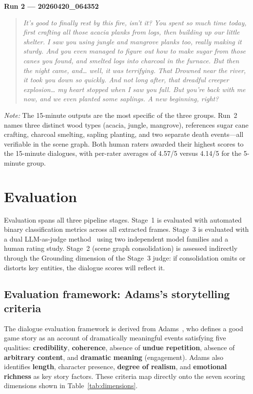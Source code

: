 \documentclass{article}
\begin{document}
\textbf{Run 2 --- 20260420\_064352}
\begin{quote}\itshape
It's good to finally rest by this fire, isn't it? You spent so much time today, first
crafting all those acacia planks from logs, then building up our little shelter. I saw
you using jungle and mangrove planks too, really making it sturdy. And you even managed
to figure out how to make sugar from those canes you found, and smelted logs into
charcoal in the furnace. But then the night came, and\ldots{} well, it was terrifying.
That Drowned near the river, it took you down so quickly. And not long after, that
dreadful creeper explosion\ldots{} my heart stopped when I saw you fall. But you're
back with me now, and we even planted some saplings. A new beginning, right?
\end{quote}

\noindent\textit{Note:} The 15-minute outputs are the most specific of the three groups. Run~2 names three distinct wood types (acacia, jungle, mangrove), references sugar cane crafting, charcoal smelting, sapling planting, and two separate death events---all verifiable in the scene graph. Both human raters awarded their highest scores to the 15-minute dialogues, with per-rater averages of 4.57/5 versus 4.14/5 for the 5-minute group.

\section{Evaluation}

Evaluation spans all three pipeline stages. Stage~1 is evaluated with automated binary classification metrics across all extracted frames. Stage~3 is evaluated with a dual LLM-as-judge method~\cite{Zheng2023} using two independent model families and a human rating study. Stage~2 (scene graph consolidation) is assessed indirectly through the Grounding dimension of the Stage~3 judge: if consolidation omits or distorts key entities, the dialogue scores will reflect it.

\subsection{Evaluation framework: Adams's storytelling criteria}

The dialogue evaluation framework is derived from Adams~\cite{Adams2014}, who defines a good game story as an account of dramatically meaningful events satisfying five qualities: \textbf{credibility}, \textbf{coherence}, absence of \textbf{undue repetition}, absence of \textbf{arbitrary content}, and \textbf{dramatic meaning} (engagement). Adams also identifies \textbf{length}, character presence, \textbf{degree of realism}, and \textbf{emotional richness} as key story factors. These criteria map directly onto the seven scoring dimensions shown in Table~\ref{tab:dimensions}.
\end{document}
